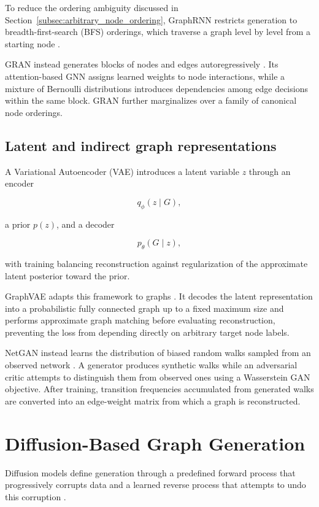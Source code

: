 To reduce the ordering ambiguity discussed in Section~\ref{subsec:arbitrary_node_ordering}, GraphRNN restricts generation to breadth-first-search (BFS) orderings, which traverse a graph level by level from a starting node \cite{you2018graphrnn}.

GRAN instead generates blocks of nodes and edges autoregressively \cite{liao2019efficient}. Its attention-based GNN assigns learned weights to node interactions, while a mixture of Bernoulli distributions introduces dependencies among edge decisions within the same block. GRAN further marginalizes over a family of canonical node orderings.


\subsection{Latent and indirect graph representations}
\label{subsec:rw_latent_graph_generation}

A Variational Autoencoder (VAE) introduces a latent variable \(z\) through an encoder

\[
q_\phi(z\mid G),
\]

a prior \(p(z)\), and a decoder

\[
p_\theta(G\mid z),
\]

with training balancing reconstruction against regularization of the approximate latent posterior toward the prior.

GraphVAE adapts this framework to graphs \cite{simonovsky2018graphvae}. It decodes the latent representation into a probabilistic fully connected graph up to a fixed maximum size and performs approximate graph matching before evaluating reconstruction, preventing the loss from depending directly on arbitrary target node labels.

NetGAN instead learns the distribution of biased random walks sampled from an observed network \cite{bojchevski2018netgan}. A generator produces synthetic walks while an adversarial critic attempts to distinguish them from observed ones using a Wasserstein GAN objective. After training, transition frequencies accumulated from generated walks are converted into an edge-weight matrix from which a graph is reconstructed.


\section{Diffusion-Based Graph Generation}
\label{sec:rw_diffusion}

Diffusion models define generation through a predefined forward process that progressively corrupts data and a learned reverse process that attempts to undo this corruption \cite{ho2020denoising}.

